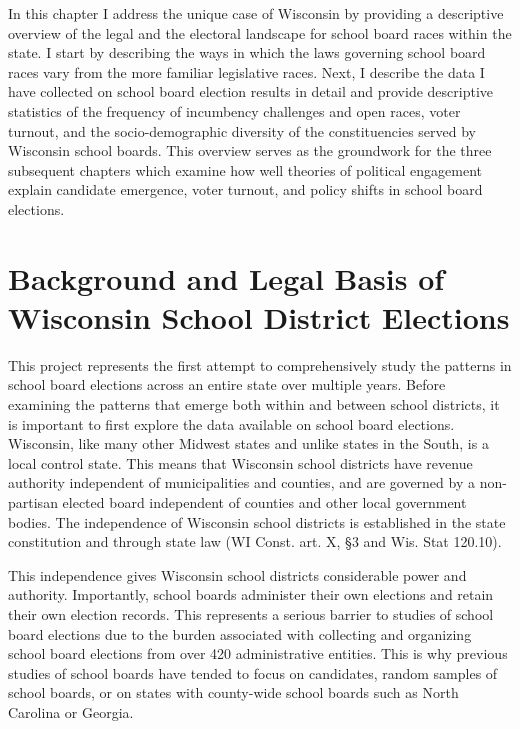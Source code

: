 In this chapter I address the unique case of Wisconsin by providing a descriptive 
overview of the legal and the electoral landscape for school board races within 
the state. I start by describing the ways in which the laws governing 
school board races vary from the more familiar legislative races. Next, I describe the data 
I have collected on school board election results in detail and provide descriptive 
statistics of the frequency of incumbency challenges and open races, voter turnout, 
and the socio-demographic diversity of the constituencies served by Wisconsin school 
boards. This overview serves as the groundwork for the three subsequent chapters 
which examine how well theories of political engagement explain candidate emergence, 
voter turnout, and policy shifts in school board elections. 

\section{Background and Legal Basis of Wisconsin School District Elections}
\label{sec:wiscolaw}
This project represents the first attempt to comprehensively study the patterns 
in school board elections across an entire state over multiple years. Before 
examining the patterns that emerge both within and between school districts, 
it is important to first explore the data available on school board elections. 
Wisconsin, like many other Midwest states and unlike states in the South, is a 
local control state. This means that Wisconsin school districts have revenue 
authority independent of municipalities and counties, and are governed by 
a non-partisan elected board independent of counties and other local government 
bodies. The independence of Wisconsin school districts is established in the 
state constitution and through state law (WI Const. art. X, \S 3 and Wis. Stat 120.10). 

This independence gives Wisconsin school districts considerable power and authority. 
Importantly, school boards administer their own elections and retain their own 
election records. This represents a serious barrier to studies of school board 
elections due to the burden associated with collecting and organizing school board 
elections from over 420 administrative entities. This is why previous studies of 
school boards have tended to focus on candidates, random samples of school boards, 
or on states with county-wide school boards such as North Carolina or Georgia. 

